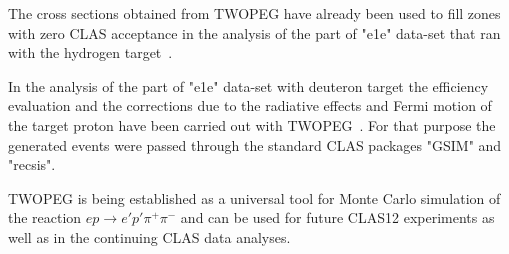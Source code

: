 The cross sections obtained from TWOPEG have already been used to fill zones with zero CLAS acceptance in the analysis of the part of "e1e" data-set that ran with the hydrogen target~\cite{Fedotov:note}.

In the analysis of the part of "e1e" data-set with deuteron target 
the efficiency evaluation and the corrections due to the radiative effects and Fermi motion of the target proton have been carried out with TWOPEG~\cite{Skorodum:note}. For that purpose the generated events were passed through the standard CLAS packages "GSIM" and "recsis".

TWOPEG is being established as a universal tool for Monte Carlo simulation of the reaction $e p \rightarrow e' p' \pi^+ \pi^-$ and can be used for future CLAS12 experiments as well as in the continuing CLAS data analyses.

